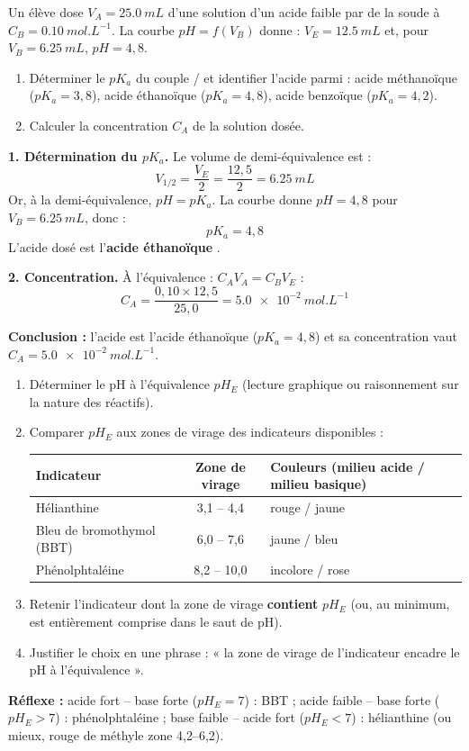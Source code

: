 \documentclass[11pt]{article}
\newcommand{\cle}[1]{{\popxbold\color{popdark}#1}}
\begin{document}
\begin{exoresolu}
Un élève dose $V_A = \SI{25,0}{mL}$ d'une solution d'un acide faible  par de la soude à $C_B = \SI{0,10}{mol.L^{-1}}$. La courbe $pH = f(V_B)$ donne : $V_E = \SI{12,5}{mL}$ et, pour $V_B = \SI{6,25}{mL}$, $pH = 4,8$.
\begin{enumerate}
\item Déterminer le $pK_a$ du couple / et identifier l'acide parmi : acide méthanoïque ($pK_a = 3,8$), acide éthanoïque ($pK_a = 4,8$), acide benzoïque ($pK_a = 4,2$).
\item Calculer la concentration $C_A$ de la solution dosée.
\end{enumerate}
\tcblower
\textbf{1. Détermination du $pK_a$.} Le volume de demi-équivalence est :
\[ V_{1/2} = \frac{V_E}{2} = \frac{12,5}{2} = \SI{6,25}{mL} \]
Or, à la demi-équivalence, $pH = pK_a$. La courbe donne $pH = 4,8$ pour $V_B = \SI{6,25}{mL}$, donc :
\[ pK_a = 4,8 \]
L'acide dosé est l'\textbf{acide éthanoïque} .

\textbf{2. Concentration.} À l'équivalence : $C_A V_A = C_B V_E$ :
\[ C_A = \frac{0,10 \times 12,5}{25,0} = \SI{5,0e-2}{mol.L^{-1}} \]

\textbf{Conclusion :} l'acide est l'acide éthanoïque ($pK_a = 4,8$) et sa concentration vaut $C_A = \SI{5,0e-2}{mol.L^{-1}}$.
\end{exoresolu}

\begin{methode}
\begin{enumerate}
\item \cle{Déterminer} le pH à l'équivalence $pH_E$ (lecture graphique ou raisonnement sur la nature des réactifs).
\item \cle{Comparer} $pH_E$ aux zones de virage des indicateurs disponibles :
\begin{center}
\begin{tabularx}{\linewidth}{|l|c|X|}
\hline
\rowcolor{popblueL} \textbf{Indicateur} & \textbf{Zone de virage} & \textbf{Couleurs (milieu acide / milieu basique)} \\
\hline
Hélianthine & 3,1 -- 4,4 & rouge / jaune \\
\hline
Bleu de bromothymol (BBT) & 6,0 -- 7,6 & jaune / bleu \\
\hline
Phénolphtaléine & 8,2 -- 10,0 & incolore / rose \\
\hline
\end{tabularx}
\end{center}
\item \cle{Retenir} l'indicateur dont la zone de virage \textbf{contient} $pH_E$ (ou, au minimum, est entièrement comprise dans le saut de pH).
\item \cle{Justifier} le choix en une phrase : « la zone de virage de l'indicateur encadre le pH à l'équivalence ».
\end{enumerate}
\textbf{Réflexe :} acide fort -- base forte ($pH_E = 7$) : BBT ; acide faible -- base forte ($pH_E > 7$) : phénolphtaléine ; base faible -- acide fort ($pH_E < 7$) : hélianthine (ou mieux, rouge de méthyle zone 4,2--6,2).
\end{methode}
\end{document}
